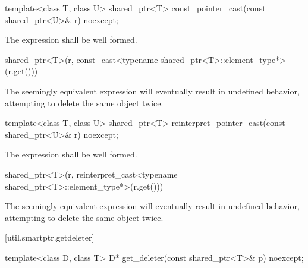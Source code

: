 %
\begin{itemdecl}
template<class T, class U>
  shared_ptr<T> const_pointer_cast(const shared_ptr<U>& r) noexcept;
\end{itemdecl}

\begin{itemdescr}
\pnum
\requires The expression  shall
be well formed.

\pnum
\returns
\begin{codeblock}
shared_ptr<T>(r, const_cast<typename shared_ptr<T>::element_type*>(r.get()))
\end{codeblock}

\pnum
\begin{note}
The seemingly equivalent expression
 will eventually result in
undefined behavior, attempting to delete the same object twice.
\end{note}
\end{itemdescr}

%
\begin{itemdecl}
template<class T, class U>
  shared_ptr<T> reinterpret_pointer_cast(const shared_ptr<U>& r) noexcept;
\end{itemdecl}

\begin{itemdescr}
\pnum
\requires The expression 
shall be well formed.

\pnum\returns
\begin{codeblock}
shared_ptr<T>(r, reinterpret_cast<typename shared_ptr<T>::element_type*>(r.get()))
\end{codeblock}

\pnum
\begin{note}
The seemingly equivalent expression
 will eventually result in
undefined behavior, attempting to delete the same object twice.
\end{note}
\end{itemdescr}

[util.smartptr.getdeleter]{}

%
\begin{itemdecl}
template<class D, class T>
  D* get_deleter(const shared_ptr<T>& p) noexcept;
\end{itemdecl}

